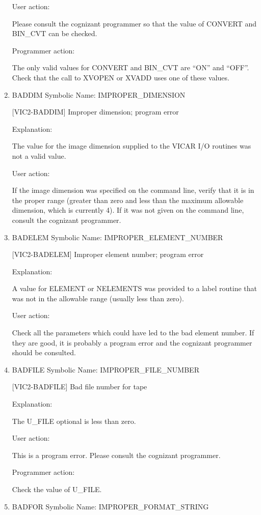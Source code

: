 \begin{enumerate}
User action:

Please consult the cognizant programmer so that the value of
CONVERT and BIN\_CVT can be checked.

Programmer action:

The only valid values for CONVERT and BIN\_CVT are ``ON'' and ``OFF''.
Check that the call to XVOPEN or XVADD uses one of these values.


\item BADDIM Symbolic Name: IMPROPER\_DIMENSION

[VIC2-BADDIM] Improper dimension; program error

Explanation:

The value for the image dimension supplied to the VICAR
I/O routines was not a valid value.

User action:

If the image dimension was specified on the command line,
verify that it is in the proper range (greater than zero and
less than the maximum allowable dimension, which is currently 4).
If it was not given on the command line, consult the cognizant programmer.


\item BADELEM Symbolic Name: IMPROPER\_ELEMENT\_NUMBER

[VIC2-BADELEM] Improper element number; program error

Explanation:

A value for ELEMENT or NELEMENTS was provided to a label routine
that was not in the allowable range (usually less than zero).

User action:

Check all the parameters which could have led to the bad element
number.  If they are good, it is probably a program error and the
cognizant programmer should be consulted.


\item BADFILE Symbolic Name: IMPROPER\_FILE\_NUMBER

[VIC2-BADFILE] Bad file number for tape

Explanation:

The U\_FILE optional is less than zero.

User action:

This is a program error.  Please consult the cognizant programmer.

Programmer action:

Check the value of U\_FILE.


\item BADFOR Symbolic Name: IMPROPER\_FORMAT\_STRING


\end{enumerate}
